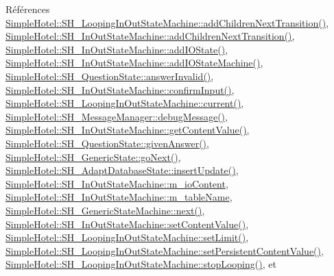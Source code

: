 Références \hyperlink{classSimpleHotel_1_1SH__LoopingInOutStateMachine_a2ac2ff43d97fd1b12e1b30d6818f33e4}{Simple\-Hotel\-::\-S\-H\-\_\-\-Looping\-In\-Out\-State\-Machine\-::add\-Children\-Next\-Transition()}, \hyperlink{classSimpleHotel_1_1SH__InOutStateMachine_aaf5afe04d6e4d3d5ebf0b5f1b00eddf1}{Simple\-Hotel\-::\-S\-H\-\_\-\-In\-Out\-State\-Machine\-::add\-Children\-Next\-Transition()}, \hyperlink{classSimpleHotel_1_1SH__InOutStateMachine_a07ae9f1f74a9a41b26e77a014679a33e}{Simple\-Hotel\-::\-S\-H\-\_\-\-In\-Out\-State\-Machine\-::add\-I\-O\-State()}, \hyperlink{classSimpleHotel_1_1SH__InOutStateMachine_a27a59a44e0bcddf90d40b38788bb38f4}{Simple\-Hotel\-::\-S\-H\-\_\-\-In\-Out\-State\-Machine\-::add\-I\-O\-State\-Machine()}, \hyperlink{classSimpleHotel_1_1SH__QuestionState_a69caaa66c68de820a5afa9584f24ca31}{Simple\-Hotel\-::\-S\-H\-\_\-\-Question\-State\-::answer\-Invalid()}, \hyperlink{classSimpleHotel_1_1SH__InOutStateMachine_a949cdb448f813f201b6ca827d1c860e9}{Simple\-Hotel\-::\-S\-H\-\_\-\-In\-Out\-State\-Machine\-::confirm\-Input()}, \hyperlink{classSimpleHotel_1_1SH__LoopingInOutStateMachine_a8fea676c16c02ceb82cbb8a93088634e}{Simple\-Hotel\-::\-S\-H\-\_\-\-Looping\-In\-Out\-State\-Machine\-::current()}, \hyperlink{classSimpleHotel_1_1SH__MessageManager_ad680f823897b7bf70e46ee18326c08b2}{Simple\-Hotel\-::\-S\-H\-\_\-\-Message\-Manager\-::debug\-Message()}, \hyperlink{classSimpleHotel_1_1SH__InOutStateMachine_a4e2afab69163c7ce53dd6a40c793d5dc}{Simple\-Hotel\-::\-S\-H\-\_\-\-In\-Out\-State\-Machine\-::get\-Content\-Value()}, \hyperlink{classSimpleHotel_1_1SH__QuestionState_a243f09bc1f822af7748edb038ac2957c}{Simple\-Hotel\-::\-S\-H\-\_\-\-Question\-State\-::given\-Answer()}, \hyperlink{classSimpleHotel_1_1SH__GenericState_a5afea8cc17017b08b8db6d51b5bcefc4}{Simple\-Hotel\-::\-S\-H\-\_\-\-Generic\-State\-::go\-Next()}, \hyperlink{classSimpleHotel_1_1SH__AdaptDatabaseState_af125e11b83df08b8e67f90c55c69d583}{Simple\-Hotel\-::\-S\-H\-\_\-\-Adapt\-Database\-State\-::insert\-Update()}, \hyperlink{classSimpleHotel_1_1SH__InOutStateMachine_a4b0a3a48b0da31fddb724a357ad9b52c}{Simple\-Hotel\-::\-S\-H\-\_\-\-In\-Out\-State\-Machine\-::m\-\_\-io\-Content}, \hyperlink{classSimpleHotel_1_1SH__InOutStateMachine_a15c063debdaa4c87bd4925867a13ce9e}{Simple\-Hotel\-::\-S\-H\-\_\-\-In\-Out\-State\-Machine\-::m\-\_\-table\-Name}, \hyperlink{classSimpleHotel_1_1SH__GenericStateMachine_a2de14d4920ae8c10b70c2d73fc2d4a93}{Simple\-Hotel\-::\-S\-H\-\_\-\-Generic\-State\-Machine\-::next()}, \hyperlink{classSimpleHotel_1_1SH__InOutStateMachine_aaf92da452f6cf7cc57aa9e60f88322e4}{Simple\-Hotel\-::\-S\-H\-\_\-\-In\-Out\-State\-Machine\-::set\-Content\-Value()}, \hyperlink{classSimpleHotel_1_1SH__LoopingInOutStateMachine_a502bc84b055b1cbacf5999dca26bc171}{Simple\-Hotel\-::\-S\-H\-\_\-\-Looping\-In\-Out\-State\-Machine\-::set\-Limit()}, \hyperlink{classSimpleHotel_1_1SH__LoopingInOutStateMachine_a688f77a7c6dbbf102cf75234a58b4f97}{Simple\-Hotel\-::\-S\-H\-\_\-\-Looping\-In\-Out\-State\-Machine\-::set\-Persistent\-Content\-Value()}, \hyperlink{classSimpleHotel_1_1SH__LoopingInOutStateMachine_a64951d436e3f998c7136415019021ec8}{Simple\-Hotel\-::\-S\-H\-\_\-\-Looping\-In\-Out\-State\-Machine\-::stop\-Looping()}, et 